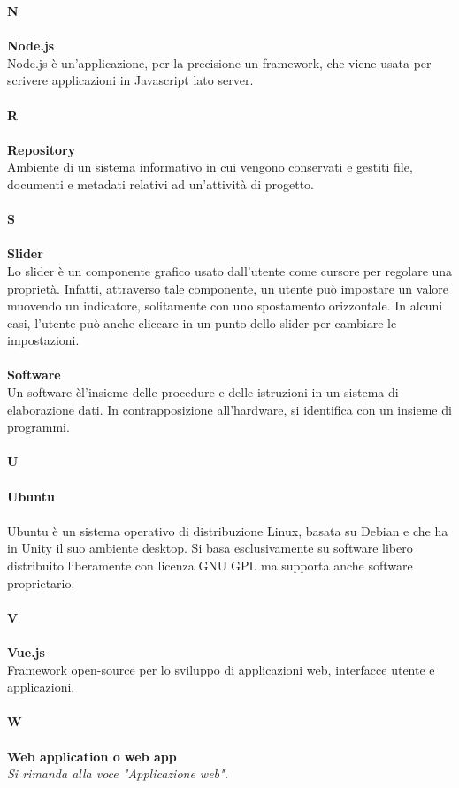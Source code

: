 \textbf{N}\\
\\
\textbf{Node.js} \\
Node.js è un’applicazione, per la precisione un framework, che viene usata per scrivere applicazioni in Javascript lato server. \\
\\
\textbf{R} \\
\\
\textbf{Repository} \\
Ambiente di un sistema informativo in cui vengono conservati e gestiti file, documenti e metadati relativi ad un’attività di progetto. \\
\\
\textbf{S} \\
\\
\textbf{Slider} \\
Lo slider è un componente grafico usato dall'utente come cursore per regolare una proprietà. Infatti, attraverso tale componente, un utente può impostare un valore muovendo un indicatore, solitamente con uno spostamento orizzontale. In alcuni casi, l'utente può anche cliccare in un punto dello slider per cambiare le impostazioni.  \\
\\
\textbf{Software} \\
Un software èl'insieme delle procedure e delle istruzioni in un sistema di elaborazione dati. In contrapposizione all'hardware, si identifica con un insieme di programmi. \\
\\
\textbf{U} \\
\\
\textbf{Ubuntu} \\
\\
Ubuntu è un sistema operativo di distribuzione Linux, basata su Debian e che ha in Unity il suo ambiente desktop. Si basa esclusivamente su software libero distribuito liberamente con licenza GNU GPL ma supporta anche software proprietario. \\
\\
\textbf{V}\\
\\
\textbf{Vue.js}\\
 Framework open-source per lo sviluppo di applicazioni web, interfacce utente e applicazioni. \\
\\
\textbf{W} \\
\\
\textbf{Web application o web app}\\
\textit{Si rimanda alla voce "Applicazione web".}